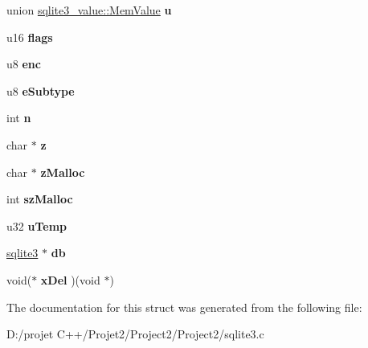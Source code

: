 \begin{DoxyCompactItemize}
\item 
\mbox{\label{structsqlite3__value_a619b76757012d96d688b2fa8553921a5}} 
union \mbox{\hyperlink{unionsqlite3__value_1_1_mem_value}{sqlite3\+\_\+value\+::\+Mem\+Value}} {\bfseries u}
\item 
\mbox{\label{structsqlite3__value_a83d279b3d99f2d6b202cb269dc5afb8b}} 
u16 {\bfseries flags}
\item 
\mbox{\label{structsqlite3__value_a2b0d5eac4e14a699c8b58c593d25dce7}} 
u8 {\bfseries enc}
\item 
\mbox{\label{structsqlite3__value_ae59191dcf28e21cdf26b551ecc18b4c6}} 
u8 {\bfseries e\+Subtype}
\item 
\mbox{\label{structsqlite3__value_acf4481e6fcff5216526151a9adb1715c}} 
int {\bfseries n}
\item 
\mbox{\label{structsqlite3__value_aef9726f32e031e9d729113fb96ec9948}} 
char $\ast$ {\bfseries z}
\item 
\mbox{\label{structsqlite3__value_ad1d1f43b9e3a01c62c79d032a73e0b93}} 
char $\ast$ {\bfseries z\+Malloc}
\item 
\mbox{\label{structsqlite3__value_a5337b409ea8d315f5d376fadef8a61cc}} 
int {\bfseries sz\+Malloc}
\item 
\mbox{\label{structsqlite3__value_adfa9a766a43e673a8a90fe50f2b36fc4}} 
u32 {\bfseries u\+Temp}
\item 
\mbox{\label{structsqlite3__value_ab4dab30fa8816d3bf668df2b2fbfaebd}} 
\mbox{\hyperlink{structsqlite3}{sqlite3}} $\ast$ {\bfseries db}
\item 
\mbox{\label{structsqlite3__value_a40cb806c8c47b7f1e22873ce48f61223}} 
void($\ast$ {\bfseries x\+Del} )(void $\ast$)
\end{DoxyCompactItemize}


The documentation for this struct was generated from the following file\+:\begin{DoxyCompactItemize}
\item 
D\+:/projet C++/\+Projet2/\+Project2/\+Project2/sqlite3.\+c\end{DoxyCompactItemize}
